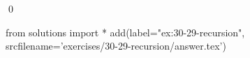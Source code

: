 
\begin{ex}
  \label{ex:30-29-recursion}
  
  \qed
\end{ex}
\begin{python0}
from solutions import *
add(label="ex:30-29-recursion",
    srcfilename='exercises/30-29-recursion/answer.tex')
\end{python0}
